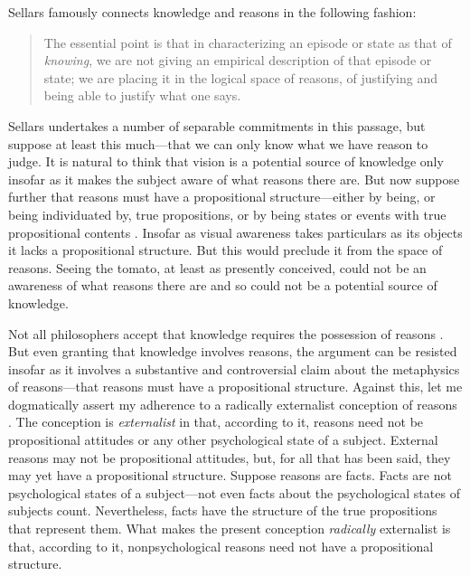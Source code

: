 \documentclass[12pt]{article}
\begin{document}
Sellars famously connects knowledge and reasons in the following fashion:
\begin{quote}
	The essential point is that in characterizing an episode or state as that of \emph{knowing}, we are not giving an empirical description of that episode or state; we are placing it in the logical space of reasons, of justifying and being able to justify what one says. \citep[§36]{Sellars:1956xp}
\end{quote}
Sellars undertakes a number of separable commitments in this passage, but suppose at least this much---that we can only know what we have reason to judge. It is natural to think that vision is a potential source of knowledge only insofar as it makes the subject aware of what reasons there are. But now suppose further that reasons must have a propositional structure---either by being, or being individuated by, true propositions, or by being states or events with true propositional contents \citep[see][141, 143--4]{McDowell:1996uq}. Insofar as visual awareness takes particulars as its objects it lacks a propositional structure. But this would preclude it from the space of reasons. Seeing the tomato, at least as presently conceived, could not be an awareness of what reasons there are and so could not be a potential source of knowledge.

Not all philosophers accept that knowledge requires the possession of reasons \citep[see][for a recent expression of skepticism]{Pryor:2007fk}. But even granting that knowledge involves reasons, the argument can be resisted insofar as it involves a substantive and controversial claim about the metaphysics of reasons---that reasons must have a propositional structure. Against this, let me dogmatically assert my adherence to a radically externalist conception of reasons \citep[see][]{Scanlon:1998hb,Raz:2000tm}. The conception is \emph{externalist} in that, according to it, reasons need not be propositional attitudes or any other psychological state of a subject. External reasons may not be propositional attitudes, but, for all that has been said, they may yet have a propositional structure. Suppose reasons are facts. Facts are not psychological states of a subject---not even facts about the psychological states of subjects count. Nevertheless, facts have the structure of the true propositions that represent them. What makes the present conception \emph{radically} externalist is that, according to it, nonpsychological reasons need not have a propositional structure.
\end{document}
